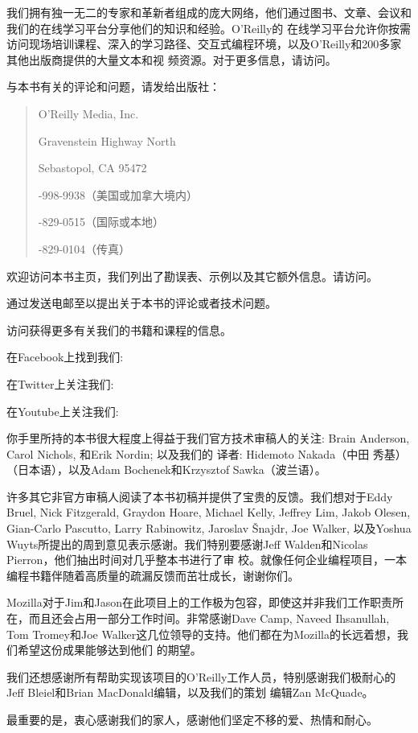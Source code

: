 \medskip
我们拥有独一无二的专家和革新者组成的庞大网络，他们通过图书、文章、会议和我们的在线学习平台分享他们的知识和经验。O'Reilly的
在线学习平台允许你按需访问现场培训课程、深入的学习路径、交互式编程环境，以及O'Reilly和200多家其他出版商提供的大量文本和视
频资源。对于更多信息，请访问。


与本书有关的评论和问题，请发给出版社：
    \begin{quote}
        O'Reilly Media, Inc.

         Gravenstein Highway North

        \smallskip
        Sebastopol, CA 95472

        -998-9938（美国或加拿大境内）

        -829-0515（国际或本地）

        -829-0104（传真）
    \end{quote}
欢迎访问本书主页，我们列出了勘误表、示例以及其它额外信息。请访问。

\medskip
通过发送电邮至以提出关于本书的评论或者技术问题。

\medskip
访问获得更多有关我们的书籍和课程的信息。

\medskip
在Facebook上找到我们: 

\medskip
在Twitter上关注我们: 

\medskip
在Youtube上关注我们: 


你手里所持的本书很大程度上得益于我们官方技术审稿人的关注: Brain Anderson, Carol Nichols, 和Erik Nordin; 以及我们的
译者: Hidemoto Nakada（中田 秀基）（日本语），以及Adam Bochenek和Krzysztof Sawka（波兰语）。

\medskip
许多其它非官方审稿人阅读了本书初稿并提供了宝贵的反馈。我们想对于Eddy Bruel, Nick Fitzgerald, Graydon Hoare, Michael
 Kelly, Jeffrey Lim, Jakob Olesen, Gian-Carlo Pascutto, Larry Rabinowitz, Jaroslav Šnajdr, Joe Walker, 
以及Yoshua Wuyts所提出的周到意见表示感谢。我们特别要感谢Jeff Walden和Nicolas Pierron，他们抽出时间对几乎整本书进行了审
校。就像任何企业编程项目，一本编程书籍伴随着高质量的疏漏反馈而茁壮成长，谢谢你们。

\medskip
Mozilla对于Jim和Jason在此项目上的工作极为包容，即使这并非我们工作职责所在，而且还会占用一部分工作时间。非常感谢Dave Camp, 
Naveed Ihsanullah, Tom Tromey和Joe Walker这几位领导的支持。他们都在为Mozilla的长远着想，我们希望这份成果能够达到他们
的期望。

\medskip
我们还想感谢所有帮助实现该项目的O'Reilly工作人员，特别感谢我们极耐心的Jeff Bleiel和Brian MacDonald编辑，以及我们的策划
编辑Zan McQuade。

\medskip
最重要的是，衷心感谢我们的家人，感谢他们坚定不移的爱、热情和耐心。